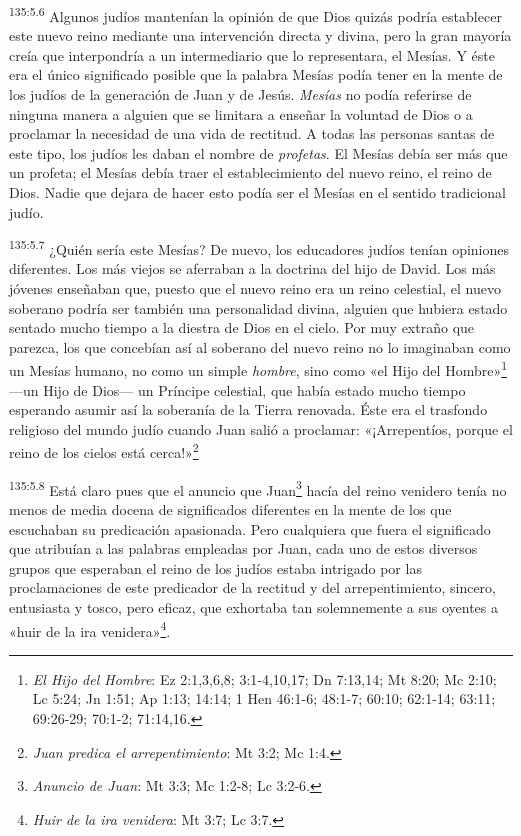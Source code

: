 \par 
\textsuperscript{135:5.6} Algunos judíos mantenían la opinión de que Dios quizás podría establecer este nuevo reino mediante una intervención directa y divina, pero la gran mayoría creía que interpondría a un intermediario que lo representara, el Mesías. Y éste era el único significado posible que la palabra Mesías podía tener en la mente de los judíos de la generación de Juan y de Jesús. \textit{Mesías} no podía referirse de ninguna manera a alguien que se limitara a enseñar la voluntad de Dios o a proclamar la necesidad de una vida de rectitud. A todas las personas santas de este tipo, los judíos les daban el nombre de \textit{profetas}. El Mesías debía ser más que un profeta; el Mesías debía traer el establecimiento del nuevo reino, el reino de Dios. Nadie que dejara de hacer esto podía ser el Mesías en el sentido tradicional judío.

\par 
\textsuperscript{135:5.7} ¿Quién sería este Mesías? De nuevo, los educadores judíos tenían opiniones diferentes. Los más viejos se aferraban a la doctrina del hijo de David. Los más jóvenes enseñaban que, puesto que el nuevo reino era un reino celestial, el nuevo soberano podría ser también una personalidad divina, alguien que hubiera estado sentado mucho tiempo a la diestra de Dios en el cielo. Por muy extraño que parezca, los que concebían así al soberano del nuevo reino no lo imaginaban como un Mesías humano, no como un simple \textit{hombre}, sino como «el Hijo del Hombre»\footnote{\textit{El Hijo del Hombre}: Ez 2:1,3,6,8; 3:1-4,10,17; Dn 7:13,14; Mt 8:20; Mc 2:10; Lc 5:24; Jn 1:51; Ap 1:13; 14:14; 1 Hen 46:1-6; 48:1-7; 60:10; 62:1-14; 63:11; 69:26-29; 70:1-2; 71:14,16.} ---un Hijo de Dios--- un Príncipe celestial, que había estado mucho tiempo esperando asumir así la soberanía de la Tierra renovada. Éste era el trasfondo religioso del mundo judío cuando Juan salió a proclamar: «¡Arrepentíos, porque el reino de los cielos está cerca!»\footnote{\textit{Juan predica el arrepentimiento}: Mt 3:2; Mc 1:4.}

\par 
\textsuperscript{135:5.8} Está claro pues que el anuncio que Juan\footnote{\textit{Anuncio de Juan}: Mt 3:3; Mc 1:2-8; Lc 3:2-6.} hacía del reino venidero tenía no menos de media docena de significados diferentes en la mente de los que escuchaban su predicación apasionada. Pero cualquiera que fuera el significado que atribuían a las palabras empleadas por Juan, cada uno de estos diversos grupos que esperaban el reino de los judíos estaba intrigado por las proclamaciones de este predicador de la rectitud y del arrepentimiento, sincero, entusiasta y tosco, pero eficaz, que exhortaba tan solemnemente a sus oyentes a «huir de la ira venidera»\footnote{\textit{Huir de la ira venidera}: Mt 3:7; Lc 3:7.}.

